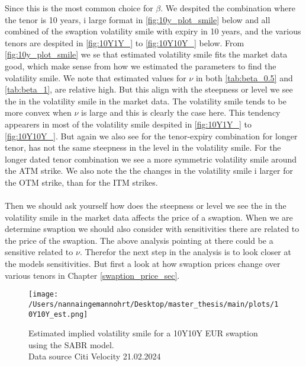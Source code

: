 Since this is the most common choice for $\beta$. We despited the combination where the tenor is 10 years, i large format in 
\autoref{fig:10y_plot_smile} below and all combined of the swaption volatility smile with expiry in 10 years, and the 
various tenors are despited in \autoref{fig:10Y1Y_} to \autoref{fig:10Y10Y_} below. 
From \autoref{fig:10y_plot_smile}  we se that estimated volatility smile fits the market data good, which make sense from 
how we estimated the parameters to find the volatility smile. We note that estimated values for $\nu$ in both 
\autoref{tab:beta_0.5} and \autoref{tab:beta_1}, are relative high. But this align with the steepness or level we see the in the 
volatility smile in the market data. The volatility smile tends to be more convex when $\nu$ is large and this is clearly 
the case here. This tendency appearers in  most of the volatility smile despited in \autoref{fig:10Y1Y_} to \autoref{fig:10Y10Y_}.
But again we also see for the tenor-expiry combination for longer tenor, has not the same steepness in the level in 
the volatility smile. For the longer dated tenor combination we see a more symmetric volatility smile around the
ATM strike. We also note the the changes in the volatility smile i larger for the OTM strike, than for the ITM strikes. 
\\\\
Then we should ask yourself how does the  steepness or level we see the in the 
volatility smile in the market data affects the price of a swaption. When we are determine swaption we should also consider 
with sensitivities there are related to the price of the swaption. The above analysis pointing at there could 
be a sensitive related to $\nu$. Therefor the next step in the analysis is to look closer at the models sensitivities. 
But first a look at how swaption prices change over various tenors in Chapter \ref{swaption_price_sec}.

\begin{figure}[H]
    \centering
    \texttt{[image: /Users/nannaingemannohrt/Desktop/master\_thesis/main/plots/10Y10Y\_est.png]}
    \caption{Estimated implied volatility smile for a 10Y10Y EUR swaption using the SABR model. 
    \\ Data source Citi Velocity 21.02.2024}
    \label{fig:10y_plot_smile}
\end{figure}
\noindent


